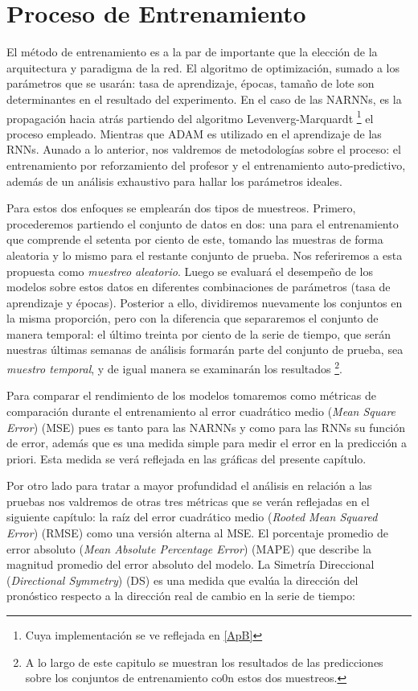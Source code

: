 \chapter{Proceso de Entrenamiento} 
\label{cap:entrenamiento} 

El método de entrenamiento es a la par de importante que la elección de la arquitectura y paradigma de la red. El algoritmo de optimización, sumado a los parámetros que se usarán: tasa de aprendizaje, épocas, tamaño de lote son determinantes en el resultado del experimento. En el caso de las NARNNs, es la propagación hacia atrás partiendo del algoritmo Levenverg-Marquardt \footnote{Cuya implementación se ve reflejada en \ref{ApB}} el proceso empleado. Mientras que ADAM es utilizado en el aprendizaje de las RNNs. Aunado a lo anterior, nos valdremos de metodologías sobre el proceso: el entrenamiento por reforzamiento del profesor y el entrenamiento auto-predictivo, además de un análisis exhaustivo para hallar los parámetros ideales.

Para estos dos enfoques se emplearán dos tipos de muestreos. Primero, procederemos partiendo el conjunto de datos en dos: una para el entrenamiento que comprende el setenta por ciento de este, tomando las muestras de forma aleatoria y lo mismo para el restante conjunto de prueba. Nos referiremos a esta propuesta como \textit{muestreo aleatorio}. Luego se evaluará el desempeño de los modelos sobre estos datos en diferentes combinaciones de parámetros (tasa de aprendizaje y épocas). Posterior a ello, dividiremos nuevamente los conjuntos en la misma proporción, pero con la diferencia que separaremos el conjunto de manera temporal: el último treinta por ciento de la serie de tiempo, que serán nuestras últimas semanas de análisis formarán parte del conjunto de prueba, sea \textit{muestro temporal}, y de igual manera se examinarán los resultados \footnote{A lo largo de este capitulo se muestran los resultados de las predicciones sobre los conjuntos de entrenamiento co0n estos dos muestreos.}.

Para comparar el rendimiento de los modelos tomaremos como métricas de comparación durante el entrenamiento al error cuadrático medio (\textit{Mean Square Error}) (MSE) pues es tanto para las NARNNs y como para las RNNs su función de error, además que es una medida simple para medir el error en la predicción a priori. Esta medida se verá reflejada en las gráficas del presente capítulo.

Por otro lado para tratar a mayor profundidad el análisis en relación a las pruebas nos valdremos de otras tres métricas que se verán reflejadas en el siguiente capítulo: la raíz del error cuadrático medio (\textit{Rooted Mean Squared Error}) (RMSE) como una versión alterna al MSE. El porcentaje promedio de error absoluto (\textit{Mean Absolute Percentage Error}) (MAPE) que describe la magnitud promedio del error absoluto del modelo. La Simetría Direccional (\textit{Directional Symmetry}) (DS) es una medida que evalúa la dirección del pronóstico respecto a la dirección real de cambio en la serie de tiempo:

